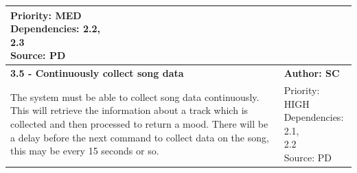 \documentclass[10pt]{report}
\begin{document}
\begin{center}
\begin{longtable}{| p{13cm} | p{3cm} |}
\makecell{Priority: MED\\Dependencies: 2.2,\\ 2.3\\Source: PD}\\
\hline
\textbf{3.5 - Continuously collect song data} & \textbf{Author: SC} \\
\hline
The system must be able to collect song data continuously. This will retrieve the information about a track which is collected and then processed to return a mood. There will be a delay before the next command to collect data on the song, this may be every 15 seconds or so. & 
\makecell{Priority: HIGH\\Dependencies: 2.1,\\2.2\\Source: PD}\\
\hline



\end{longtable}
\end{center}
\end{document}
